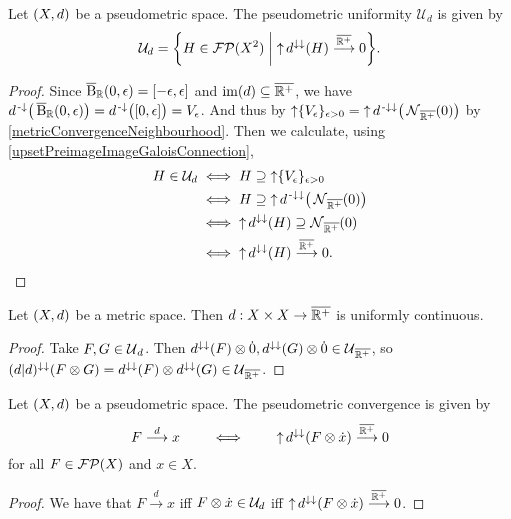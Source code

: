 \begin{proposition} \label{imagePseudometricConvergesToZero}
Let $\sSet{X,d}$ be a pseudometric space. The pseudometric uniformity $\mathcal{U}_d$ is given by
\[ \mathcal{U}_d = \setbuilder{H\in \powerfilters(X^2)}{\upset d^{\imf\imf}(H) \overset{\overline{\R^+}}{\longrightarrow} 0}.  \]
\end{proposition}
\begin{proof}
Since $\cball_\R(0,\epsilon) = \interval{-\epsilon, \epsilon}$ and $\operatorname{im}(d)\subseteq \overline{\mathbb{R}^+}$, we have $d^\preimf\big(\cball_\R(0,\epsilon)\big) = d^\preimf\big(\interval{0,\epsilon}\big) = V_\epsilon$. And thus by $\operatorname{\uparrow}\{V_\epsilon\}_{\epsilon > 0} = \operatorname{\uparrow} d^{{\text{\hspace{0.15em}-}\downarrow}\downarrow}\big(\operatorname{\mathcal{N}}_{\overline{\mathbb{R}^+}}(0)\big)$ by \ref{metricConvergenceNeighbourhood}. Then we calculate, using \ref{upsetPreimageImageGaloisConnection},
\begin{align*}
H \in \mathcal{U}_d &\iff H \supseteq \operatorname{\uparrow} \{V_\epsilon\}_{\epsilon > 0} \\
&\iff H \supseteq \operatorname{\uparrow} d^{{\text{\hspace{0.15em}-}\downarrow}\downarrow}\big(\operatorname{\mathcal{N}}_{\overline{\mathbb{R}^+}}(0)\big) \\
&\iff \operatorname{\uparrow} d^{\downarrow\downarrow}(H)\supseteq \operatorname{\mathcal{N}}_{\overline{\mathbb{R}^+}}(0) \\
&\iff \operatorname{\uparrow} d^{\downarrow\downarrow}(H)\overset{\overline{\mathbb{R}^+}}{\longrightarrow} 0.
\end{align*}
\end{proof}
\begin{corollary} \label{metricUniformlyContinuous}
Let $\sSet{X,d}$ be a metric space. Then $d: X\times X\to \overline{\mathbb{R}^+}$ is uniformly continuous.
\end{corollary}
\begin{proof}
Take $F,G\in \operatorname{\mathcal{U}}_d$. Then $d^{\downarrow\downarrow}(F)\otimes \dot{0}, d^{\downarrow\downarrow}(G)\otimes \dot{0}\in \operatorname{\mathcal{U}}_{\overline{\mathbb{R}^+}}$, so $(d|d)^{\downarrow\downarrow}(F\otimes G) = d^{\downarrow\downarrow}(F)\otimes d^{\downarrow\downarrow}(G)\in \operatorname{\mathcal{U}}_{\overline{\mathbb{R}^+}}$.
\end{proof}
\begin{corollary} \label{metricConvergence}
Let $\sSet{X,d}$ be a pseudometric space. The pseudometric convergence is given by
\[ F \overset{d}{\longrightarrow} x \qquad\iff\qquad \operatorname{\uparrow} d^{\downarrow\downarrow}(F\otimes \dot{x}) \overset{\overline{\mathbb{R}^+}}{\longrightarrow} 0 \]
for all $F\in \operatorname{\mathcal{FP}}(X)$ and $x\in X$.
\end{corollary}
\begin{proof}
We have that $F \overset{d}{\longrightarrow} x$ iff $F\otimes \dot{x}\in \mathcal{U}_d$ iff $\operatorname{\uparrow} d^{\downarrow\downarrow}(F\otimes \dot{x}) \overset{\overline{\mathbb{R}^+}}{\longrightarrow} 0$.
\end{proof}
